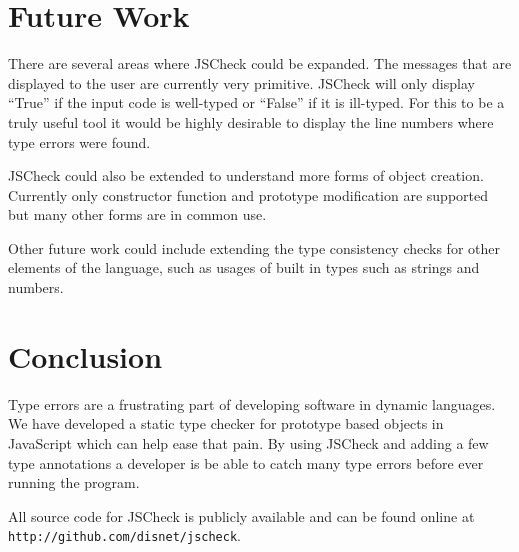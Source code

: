 \documentclass{article}
\begin{document}
\section{Future Work}
\label{sec:future}
There are several areas where JSCheck could be expanded. The messages that are displayed
to the user are currently very primitive. JSCheck will only display ``True'' if the
input code is well-typed or ``False'' if it is ill-typed. For this to be a truly useful tool
it would be highly desirable to display the line numbers where type errors were found.

JSCheck could also be extended to understand more forms of object creation. Currently
only constructor function and prototype modification are supported but many other forms
are in common use.

Other future work could include extending the type consistency checks for other elements 
of the language, such as usages of built in types such as strings and numbers.

\section{Conclusion}
\label{sec:conclusion}
Type errors are a frustrating part of developing software in dynamic languages.
We have developed a static type checker for prototype based objects in JavaScript which
can help ease that pain.
By using JSCheck and adding a few type annotations a developer is be able to catch many
type errors before ever running the program. 

All source code for JSCheck is publicly available and can be found online at
{\tt http://github.com/disnet/jscheck}.



\end{document}
